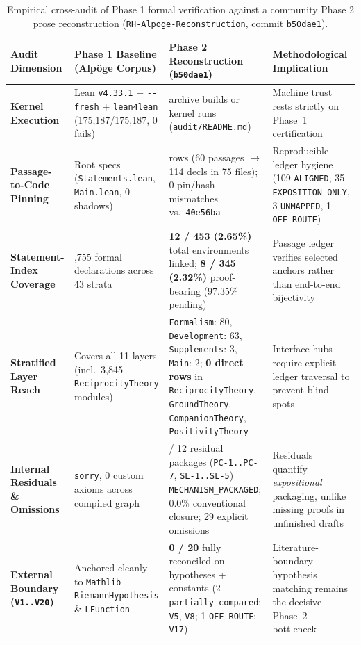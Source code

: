 \documentclass[11pt,a4paper]{article}
\begin{document}
\begin{table}[!htb]
\centering
\caption{Empirical cross-audit of Phase 1 formal verification against a community Phase 2 prose reconstruction (\texttt{RH-Alpoge-Reconstruction}, commit \texttt{b50dae1}).}
\label{tab:phase2_cross}
\scriptsize
\setlength{\tabcolsep}{3.5pt}
\begin{tabular}{@{}>{\raggedright\arraybackslash}p{}>{\raggedright\arraybackslash}p{}>{\raggedright\arraybackslash}p{}>{\raggedright\arraybackslash}p{}@{}}
\toprule
\textbf{Audit Dimension} & \textbf{Phase 1 Baseline (Alpöge Corpus)} & \textbf{Phase 2 Reconstruction (\texttt{b50dae1})} & \textbf{Methodological Implication} \\
\midrule
\textbf{Kernel Execution} & Lean \texttt{v4.33.1} + \texttt{-{}-fresh} + \texttt{lean4lean} (175,187/175,187, 0 fails) & 0 archive builds or kernel runs (\texttt{audit/README.md}) & Machine trust rests strictly on Phase~1 certification \\
\textbf{Passage-to-Code Pinning} & Root specs (\texttt{Statements.lean}, \texttt{Main.lean}, 0 shadows) & 148 rows (60 passages $\to$ 114 decls in 75 files); 0 pin/hash mismatches vs.\ \texttt{40e56ba} & Reproducible ledger hygiene (109 \texttt{ALIGNED}, 35 \texttt{EXPOSITION\_ONLY}, 3 \texttt{UNMAPPED}, 1 \texttt{OFF\_ROUTE}) \\
\textbf{Statement-Index Coverage} & 818,755 formal declarations across 43 strata & \textbf{12 / 453 (2.65\%)} total environments linked; \textbf{8 / 345 (2.32\%)} proof-bearing (97.35\% pending) & Passage ledger verifies selected anchors rather than end-to-end bijectivity \\
\textbf{Stratified Layer Reach} & Covers all 11 layers (incl.\ 3,845 \texttt{ReciprocityTheory} modules) & \texttt{Formalism}: 80, \texttt{Development}: 63, \texttt{Supplements}: 3, \texttt{Main}: 2; \textbf{0 direct rows} in \texttt{ReciprocityTheory}, \texttt{GroundTheory}, \texttt{CompanionTheory}, \texttt{PositivityTheory} & Interface hubs require explicit ledger traversal to prevent blind spots \\
\textbf{Internal Residuals \& Omissions} & 0 \texttt{sorry}, 0 custom axioms across compiled graph & 12 / 12 residual packages (\texttt{PC-1..PC-7}, \texttt{SL-1..SL-5}) \texttt{MECHANISM\_PACKAGED}; 0.0\% conventional closure; 29 explicit omissions & Residuals quantify \emph{expositional} packaging, unlike missing proofs in unfinished drafts \\
\textbf{External Boundary (\texttt{V1..V20})} & Anchored cleanly to \texttt{Mathlib} \texttt{RiemannHypothesis} \& \texttt{LFunction} & \textbf{0 / 20} fully reconciled on hypotheses + constants (2 \texttt{partially compared}: \texttt{V5}, \texttt{V8}; 1 \texttt{OFF\_ROUTE}: \texttt{V17}) & Literature-boundary hypothesis matching remains the decisive Phase~2 bottleneck \\

\end{tabular}
\end{table}
\end{document}
